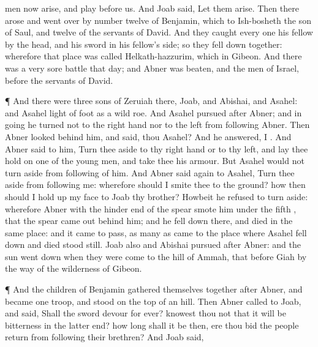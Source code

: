 {men now
arise, and
play
before us. And
Joab
said, Let them
arise.
Then there
arose and went
over by
number
twelve of
Benjamin, which
{} to
Ish-bosheth the
son of
Saul, and
twelve of the
servants of
David.
And they
caught every
one his
fellow by the
head, and
{} his
sword in his
fellow’s
side; so they fell
down
together: wherefore that
place was
called
Helkath-hazzurim, which
{} in
Gibeon.
And there was a
very
sore
battle that
day; and
Abner was
beaten, and the
men of
Israel,
before the
servants of
David.
\par }{\PP {}¶ And there were
three
sons of
Zeruiah there,
Joab, and
Abishai, and
Asahel: and
Asahel
{}
light of
foot as
a
wild
roe.
And
Asahel
pursued
after
Abner; and in
going he
turned not to the right
hand nor to the
left from
following
Abner.
Then
Abner
looked
behind him, and
said,
{} thou
Asahel? And he
answered, I
{}.
And
Abner
said to him, Turn thee
aside to thy right
hand or to thy
left, and lay thee
hold on
one of the young
men, and
take thee his
armour. But
Asahel
would not turn
aside from
following of him.
And
Abner
said
again to
Asahel, Turn thee
aside from
following me: wherefore should I
smite thee to the
ground? how then should I hold
up my
face to
Joab thy
brother?
Howbeit he
refused to turn
aside: wherefore
Abner with the hinder
end of the
spear
smote him
under the
fifth
{}, that the
spear came
out
behind him; and he fell
down there, and
died in the same
place: and it came to pass,
{} as many as
came to the
place where
Asahel fell
down and
died stood
still.
Joab also and
Abishai
pursued
after
Abner: and the
sun went
down when they were
come to the
hill of
Ammah, that
{}
before
Giah by the
way of the
wilderness of
Gibeon.
\par }{\PP {}¶ And the
children of
Benjamin gathered themselves
together
after
Abner, and became
one
troop, and
stood on the
top of an
hill.
Then
Abner
called to
Joab, and
said, Shall the
sword
devour for
ever?
knowest thou not that it will be
bitterness in the latter
end? how long shall it be then, ere thou
bid the
people
return from
following their
brethren?
And
Joab
said,
{}
}
